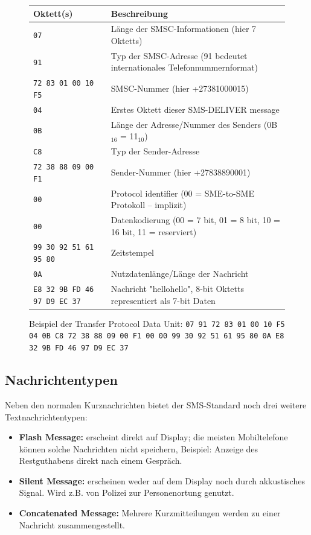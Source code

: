 \documentclass[german,12pt,a4paper]{article}
\begin{document}
\begin{figure}[h!]
    \centering
    \begin{tabular}{ p{4cm} | p{10cm} }
        \textbf{Oktett(s)} & \textbf{Beschreibung} \\
        \hline \hline
         \texttt{07} & Länge der SMSC-Informationen (hier 7 Oktetts) \\ 
         \hline
         \texttt{91} & Typ der SMSC-Adresse (91 bedeutet internationales Telefonnummernformat) \\ 
         \hline
         \texttt{72 83 01 00 10 F5} & SMSC-Nummer (hier +27381000015) \\ 
         \hline
         \texttt{04} & Erstes Oktett dieser SMS-DELIVER message \\ 
         \hline
         \texttt{0B} & Länge der Adresse/Nummer des Senders (0B$_{16}$ = 11$_{10}$) \\ 
         \hline
         \texttt{C8} & Typ der Sender-Adresse \\ 
         \hline
         \texttt{72 38 88 09 00 F1} & Sender-Nummer (hier +27838890001) \\ 
         \hline
         \texttt{00} & Protocol identifier (00 = SME-to-SME Protokoll -- implizit) \\ 
         \hline
         \texttt{00} & Datenkodierung (00 = 7 bit, 01 = 8 bit, 10 = 16 bit, 11 = reserviert) \\ 
         \hline
         \texttt{99 30 92 51 61 95 80} & Zeitstempel \\ 
         \hline
         \texttt{0A} & Nutzdatenlänge/Länge der Nachricht \\ 
         \hline
         \texttt{E8 32 9B FD 46 97 D9 EC 37} & Nachricht "hellohello", 8-bit Oktetts representiert als 7-bit Daten
    \end{tabular}
    \label{tbl:sms-struct}
    \centering
    \caption{Beispiel der Transfer Protocol Data Unit: 
        \texttt{07 91 72 83 01 00 10 F5 04 0B C8 72 38 88 09 00 F1 00 00 99 30 92 51 61 95 80 0A E8 32 9B FD 46 97 D9 EC 37}
    }
\end{figure}

\subsection{Nachrichtentypen}
Neben den normalen Kurznachrichten bietet der SMS-Standard noch drei weitere Textnachrichtentypen:
\begin{itemize}
	\item \textbf{Flash Message:} erscheint direkt auf Display; die meisten Mobiltelefone können solche Nachrichten nicht speichern,
		Beispiel: Anzeige des Restguthabens direkt nach einem Gespräch.
	\item \textbf{Silent Message:} erscheinen weder auf dem Display noch durch akkustisches Signal. 
		Wird z.B. von Polizei zur Personenortung genutzt.
	\item \textbf{Concatenated Message:} Mehrere Kurzmitteilungen werden zu einer Nachricht zusammengestellt.
\end{itemize}
\end{document}
